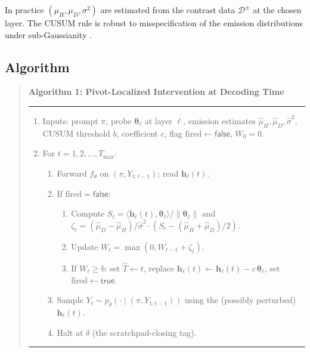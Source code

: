 \documentclass[11pt]{article}
\theoremstyle{definition}
\newcommand{\1}{\mathbf{1}}
\newcommand{\hh}{\bm{h}}
\newcommand{\thetab}{\bm{\theta}}
\begin{document}
In practice $(\mu_H, \mu_D, \sigma^2)$ are estimated from the contrast data $\mathcal{D}^{\pm}$ at the chosen layer. The CUSUM rule is robust to misspecification of the emission distributions under sub-Gaussianity \citep{moustakides1986}.

\subsection{Algorithm}

\begin{quote}
\noindent\textbf{Algorithm 1: Pivot-Localized Intervention at Decoding Time}\\[0.2em]
\hrule
\begin{enumerate}[leftmargin=1.4em,topsep=0.3em,itemsep=0.1em]
\item Inputs: prompt $\pi$, probe $\thetab_{\ell}$ at layer $\ell$, emission estimates $\widehat{\mu}_H, \widehat{\mu}_D, \widehat{\sigma}^2$, CUSUM threshold $b$, coefficient $c$, flag $\mathrm{fired} \leftarrow \mathsf{false}$, $W_0 = 0$.
\item For $t = 1, 2, \dots, T_{\max}$:
\begin{enumerate}[label=(\alph*),leftmargin=1.6em,itemsep=0.05em]
\item Forward $f_{\theta}$ on $(\pi, Y_{1:t-1})$; read $\hh_{\ell}(t)$.
\item If $\mathrm{fired} = \mathsf{false}$:
\begin{enumerate}[label=(\roman*),leftmargin=1.5em,itemsep=0.05em]
\item Compute $S_t = \langle \hh_{\ell}(t), \thetab_{\ell} \rangle / \|\thetab_{\ell}\|$ and $\zeta_t = (\widehat{\mu}_D - \widehat{\mu}_H)/\widehat{\sigma}^2 \cdot (S_t - (\widehat{\mu}_H + \widehat{\mu}_D)/2)$.
\item Update $W_t = \max(0, W_{t-1} + \zeta_t)$.
\item If $W_t \ge b$: set $\widehat{T} \leftarrow t$, replace $\hh_{\ell}(t) \leftarrow \hh_{\ell}(t) - c\, \thetab_{\ell}$, set $\mathrm{fired} \leftarrow \mathsf{true}$.
\end{enumerate}
\item Sample $Y_t \sim p_{\theta}(\cdot \mid (\pi, Y_{1:t-1}))$ using the (possibly perturbed) $\hh_{\ell}(t)$.
\item Halt at $\delta$ (the scratchpad-closing tag).
\end{enumerate}
\end{enumerate}
\hrule
\end{quote}
\end{document}
